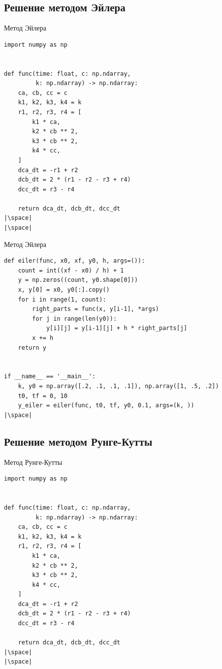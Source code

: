 \documentclass[aspectratio=169, mathserif]{beamer}	%
\begin{document}
\subsection{Решение методом Эйлера}
\begin{frame}[fragile, label=c]{Метод Эйлера}
\scriptsize
\begin{verbatim}
import numpy as np


def func(time: float, c: np.ndarray,
         k: np.ndarray) -> np.ndarray:
    ca, cb, cc = c
    k1, k2, k3, k4 = k
    r1, r2, r3, r4 = [
        k1 * ca,
        k2 * cb ** 2,
        k3 * cb ** 2,
        k4 * cc,
    ]
    dca_dt = -r1 + r2
    dcb_dt = 2 * (r1 - r2 - r3 + r4)
    dcc_dt = r3 - r4

    return dca_dt, dcb_dt, dcc_dt
|\space|
|\space|
\end{verbatim}
\vfill
\end{frame}


\begin{frame}[fragile, label=c]{Метод Эйлера}
\scriptsize
\begin{verbatim}
def eiler(func, x0, xf, y0, h, args=()):
    count = int((xf - x0) / h) + 1
    y = np.zeros((count, y0.shape[0]))
    x, y[0] = x0, y0[:].copy()
    for i in range(1, count):
        right_parts = func(x, y[i-1], *args)
        for j in range(len(y0)):
            y[i][j] = y[i-1][j] + h * right_parts[j]
        x += h
    return y


if __name__ == '__main__':
    k, y0 = np.array([.2, .1, .1, .1]), np.array([1, .5, .2])
    t0, tf = 0, 10
    y_eiler = eiler(func, t0, tf, y0, 0.1, args=(k, ))
|\space|
\end{verbatim}
\vfill
\end{frame}


\subsection{Решение методом Рунге-Кутты}
\begin{frame}[fragile, label=c]{Метод Рунге-Кутты}
\scriptsize
\begin{verbatim}
import numpy as np


def func(time: float, c: np.ndarray,
         k: np.ndarray) -> np.ndarray:
    ca, cb, cc = c
    k1, k2, k3, k4 = k
    r1, r2, r3, r4 = [
        k1 * ca,
        k2 * cb ** 2,
        k3 * cb ** 2,
        k4 * cc,
    ]
    dca_dt = -r1 + r2
    dcb_dt = 2 * (r1 - r2 - r3 + r4)
    dcc_dt = r3 - r4

    return dca_dt, dcb_dt, dcc_dt
|\space|
|\space|
\end{verbatim}
\vfill
\end{frame}
\end{document}
